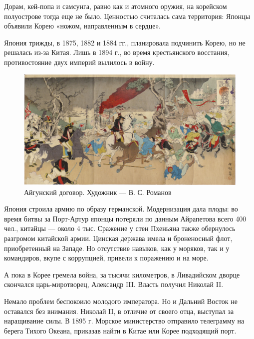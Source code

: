 Дорам, кей-попа и самсунга, равно как и атомного оружия, на корейском полуострове тогда еще не было. Ценностью считалась сама территория: Японцы объявили Корею «ножом, направленным в сердце».

Япония трижды, в 1875, 1882 и 1884 гг., планировала подчинить Корею, но не решалась из-за Китая. Лишь в 1894 г., во время крестьянского восстания, противостояние двух империй вылилось в войну.


\begin{figure}[h!tb] 
	\centering\includegraphics[scale=0.25]{Data/RYAV_predposylki/e2_wdd6jKoU.jpg}
	\caption{Айгунский договор. Художник — В. С. Романов
	}%
\end{figure}

Япония строила армию по образу германской. Модернизация дала плоды: во время битвы за Порт-Артур японцы потеряли по данным Айрапетова всего 400 чел., китайцы — около 4 тыс. Сражение у стен Пхеньяна также обернулось разгромом китайской армии. Цинская держава имела и броненосный флот, приобретенный на Западе. Но отсутствие навыков, как у моряков, так и у командиров, вкупе с коррупцией, привели к поражению и на море.

А пока в Корее гремела война, за тысячи километров, в Ливадийском дворце скончался царь-миротворец, Александр III. Власть получил Николай II.

Немало проблем беспокоило молодого императора. Но и Дальний Восток не оставался без внимания. Николай II, в отличие от своего отца, выступал за наращивание силы. В 1895 г. Морское министерство отправило телеграмму на берега Тихого Океана, приказав найти в Китае или Корее подходящий порт.

